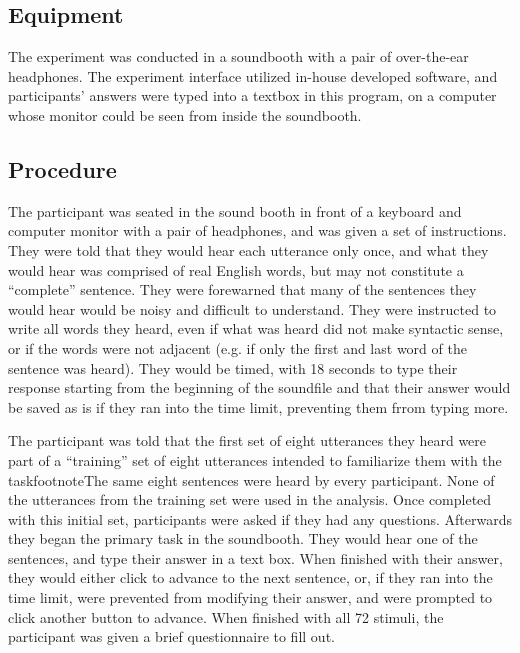 \documentclass[dissertation,copyright]{uathesis}
\begin{document}
\subsection{Equipment}

The experiment was conducted in a soundbooth with a pair of over-the-ear headphones.  The experiment interface utilized in-house developed software, and participants' answers were typed into a textbox in this program, on a computer whose monitor could be seen from inside the soundbooth.

\subsection{Procedure}
\label{hsp-main-procedure}

The participant was seated in the sound booth in front of a keyboard and computer monitor with a pair of headphones, and was given a set of instructions. They were told that they would hear each utterance only once, and what they would hear was comprised of real English words, but may not constitute a ``complete'' sentence.  They were forewarned that many of the sentences they would hear would be noisy and difficult to understand. They were instructed to write all words they heard, even if what was heard did not make syntactic sense, or if the words were not adjacent (e.g. if only the first and last word of the sentence was heard). They would be timed, with 18 seconds to type their response starting from the beginning of the soundfile and that their answer would be saved as is if they ran into the time limit, preventing them frrom typing more.

The participant was told that the first set of eight utterances they heard were part of a ``training'' set of eight utterances intended to familiarize them with the taskfootnote{The same eight sentences were heard by every participant}.  None of the utterances from the training set were used in the analysis.  Once completed with this initial set, participants were asked if they had any questions.  Afterwards they began the primary task in the soundbooth.  They would hear one of the sentences, and type their answer in a text box.  When finished with their answer, they would either click to advance to the next sentence, or, if they ran into the time limit, were prevented from modifying their answer, and were prompted to click another button to advance.  When finished with all 72 stimuli, the participant was given a brief questionnaire to fill out.  
\end{document}
